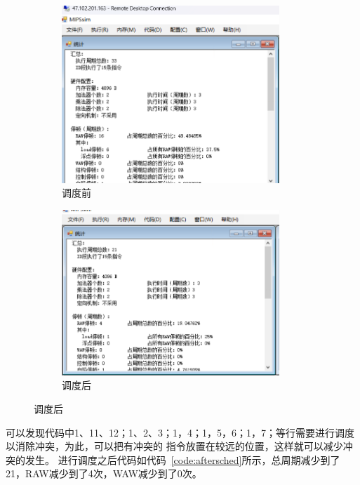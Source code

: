 \documentclass[a4paper,twoside]{article}
\begin{document}
\begin{spacing}{1.2}
\begin{figure}[htb]
	\centering
	\begin{subfigure}[b]{0.4\textwidth}
		\centering
		\includegraphics[width=0.9\textwidth]{images/scheafter.png}
		\caption{调度前}
		\label{fig:beforesched}
	\end{subfigure}
	\begin{subfigure}[b]{0.4\textwidth}
		\centering
		\includegraphics[width=0.9\textwidth]{images/schebefore.png}
		\caption{调度后}
		\label{fig:aftersched}
	\end{subfigure}
\end{figure}

可以发现代码中1、11、12；1、2、3；1，4；1，5，6；1，7；等行需要进行调度以消除冲突，为此，可以把有冲突的
指令放置在较远的位置，这样就可以减少冲突的发生。
进行调度之后代码如代码~\ref{code:aftersched}所示，总周期减少到了21，RAW减少到了4次，WAW减少到了0次。


\end{spacing}
\end{document}
